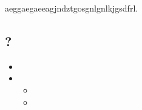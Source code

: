 aeggaegaeeagjndztgosgnlgnlkjgsdfrl. \\
\subsection{?}


\begin{itemize}
\item
\item
\begin{itemize}
\item
\item
\end{itemize}
 

\end{itemize}